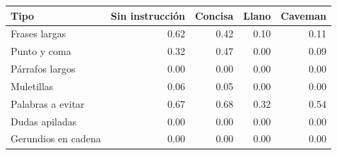 \begin{tabular}{lrrrr}
\toprule
Tipo & Sin instrucción & Concisa & Llano & Caveman \\
\midrule
Frases largas & 0.62 & 0.42 & 0.10 & 0.11 \\
Punto y coma & 0.32 & 0.47 & 0.00 & 0.09 \\
Párrafos largos & 0.00 & 0.00 & 0.00 & 0.00 \\
Muletillas & 0.06 & 0.05 & 0.00 & 0.00 \\
Palabras a evitar & 0.67 & 0.68 & 0.32 & 0.54 \\
Dudas apiladas & 0.00 & 0.00 & 0.00 & 0.00 \\
Gerundios en cadena & 0.00 & 0.00 & 0.00 & 0.00 \\
\bottomrule
\end{tabular}
